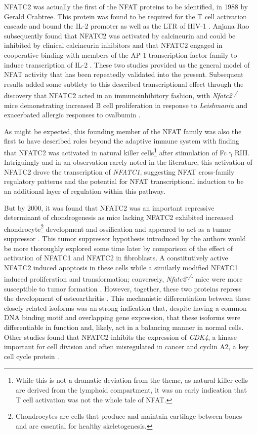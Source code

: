 NFATC2 was actually the first of the NFAT proteins to be identified, in 1988 by Gerald Crabtree. This protein was found to be required for the T cell activation cascade and bound the IL\hyp{}2 promoter as well as the LTR of HIV\hyp{}1 \citep{Shaw1988}. Anjana Rao subsequently found that NFATC2 was activated by calcineurin and could be inhibited by clinical calcineurin inhibitors and that NFATC2 engaged in cooperative binding with members of the AP\hyp{}1 transcription factor family to induce transcription of IL\hyp{}2 \citep{Jain1993}. These two studies provided us the general model of NFAT activity that has been repeatedly validated into the present. Subsequent results added some subtlety to this described transcriptional effect through the discovery that NFATC2 acted in an immunoinhibitory fashion, with \textit{Nfatc2\textsuperscript{\hyp{}/\hyp{}}} mice demonstrating increased B cell proliferation in response to \textit{Leishmania} and exacerbated allergic responses to ovalbumin \citep{Xanthoudakis1996}. 

As might be expected, this founding member of the NFAT family was also the first to have described roles beyond the adaptive immune system with \citet{Aramburu1995} finding that NFATC2 was activated in natural killer cells\footnote{While this is not a dramatic deviation from the theme, as natural killer cells are derived from the lymphoid compartment, it was an early indication that T cell activation was not the whole tale of NFAT.} after stimulation of Fc$\upgamma$RIII. Intriguingly and in an observation rarely noted in the literature, this activation of NFATC2 drove the transcription of \textit{NFATC1}, suggesting NFAT cross\hyp{}family regulatory patterns and the potential for NFAT transcriptional induction to be an additional layer of regulation within this pathway.

But by 2000, it was found that NFATC2 was an important repressive determinant of chondrogenesis as mice lacking NFATC2 exhibited increased chondrocyte\footnote{Chondrocytes are cells that produce and maintain cartilage between bones and are essential for healthy skeletogenesis.} development and ossification and appeared to act as a tumor suppressor \citep{Ranger2000}. This tumor suppressor hypothesis introduced by the authors would be more thoroughly explored some time later by comparison of the effect of activation of NFATC1 and NFATC2 in fibroblasts. A constitutively active NFATC2 induced apoptosis in these cells while a similarly modified NFATC1 induced proliferation and transformation; conversely, \textit{Nfatc2\textsuperscript{\hyp{}/\hyp{}}} mice were more susceptible to tumor formation \citep{Robbs2008}. However, together, these two proteins repress the development of osteoarthritis \citep{Greenblatt2013}. This mechanistic differentiation between these closely related isoforms was an strong indication that, despite having a common DNA binding motif and overlapping gene expression, that these isoforms were differentiable in function and, likely, act in a balancing manner in normal cells. Other studies found that NFATC2 inhibits the expression of \textit{CDK4}, a kinase important for cell division and often misregulated in cancer \citep{Baksh2002, OLeary2016} and cyclin A2, a key cell cycle protein \citep{Carvalho2007}.

